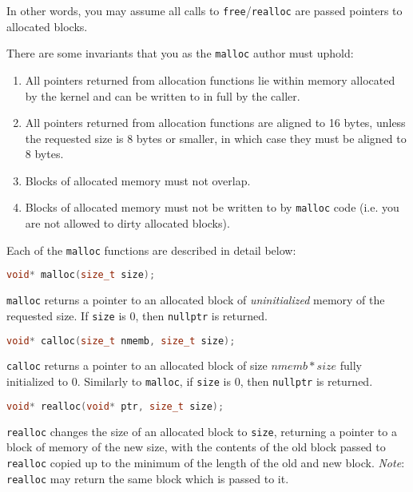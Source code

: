 \documentclass{article}
\begin{document}
In other words, you may assume all calls to \texttt{free}/\texttt{realloc} are passed pointers to allocated blocks.

There are some invariants that you as the \texttt{malloc} author must uphold:

\begin{enumerate}
    \item All pointers returned from allocation functions lie within memory allocated by the kernel and can be written to in full by the caller.
    \item All pointers returned from allocation functions are aligned to 16 bytes, unless the requested size is 8 bytes or smaller, in which case they must be aligned to 8 bytes.
    \item Blocks of allocated memory must not overlap.
    \item Blocks of allocated memory must not be written to by \texttt{malloc} code (i.e. you are not allowed to dirty allocated blocks).
\end{enumerate}

Each of the \texttt{malloc} functions are described in detail below:

\begin{lstlisting}[language=C++]
void* malloc(size_t size);
\end{lstlisting}


\texttt{malloc} returns a pointer to an allocated block of \textit{uninitialized} memory of the requested size. If \texttt{size} is 0, then \texttt{nullptr} is returned.

\begin{lstlisting}[language=C++]
void* calloc(size_t nmemb, size_t size);
\end{lstlisting}

\texttt{calloc} returns a pointer to an allocated block of size $nmemb*size$ fully initialized to 0. Similarly to \texttt{malloc}, if \texttt{size} is 0, then \texttt{nullptr} is returned.

\begin{lstlisting}[language=C++]
void* realloc(void* ptr, size_t size);
\end{lstlisting}

\texttt{realloc} changes the size of an allocated block to \texttt{size}, returning a pointer to a block of memory of the new size, with the contents of the old block passed to \texttt{realloc} copied up to the minimum of the length of the old and new block. \textit{Note}: \texttt{realloc} may return the same block which is passed to it.
\end{document}
